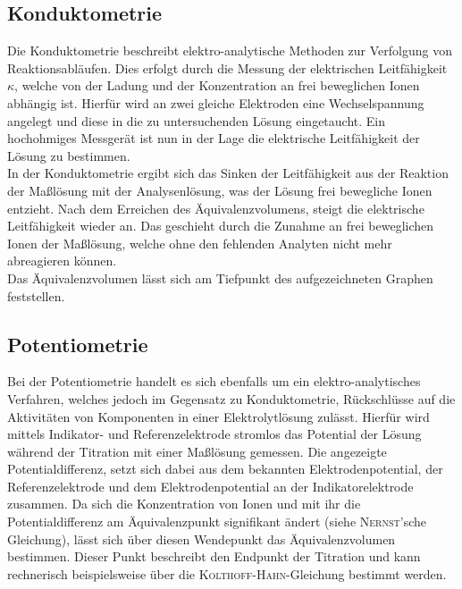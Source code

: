 \subsection*{Konduktometrie}
Die Konduktometrie beschreibt elektro-analytische Methoden zur Verfolgung von Reaktionsabläufen. Dies erfolgt durch die Messung der elektrischen Leitfähigkeit $\kappa$, welche von der Ladung und der Konzentration an frei beweglichen Ionen abhängig ist. Hierfür wird an zwei gleiche Elektroden eine Wechselspannung angelegt und diese in die zu untersuchenden Lösung eingetaucht. Ein hochohmiges Messgerät ist nun in der Lage die elektrische Leitfähigkeit der Lösung zu bestimmen.\\
In der Konduktometrie ergibt sich das Sinken der Leitfähigkeit aus der Reaktion der Maßlösung mit der Analysenlösung, was der Lösung frei bewegliche Ionen entzieht. Nach dem Erreichen des Äquivalenzvolumens, steigt die elektrische Leitfähigkeit wieder an. Das geschieht durch die Zunahme an frei beweglichen Ionen der Maßlösung, welche ohne den fehlenden Analyten nicht mehr abreagieren können.\cite{Holze.2012}\\
Das Äquivalenzvolumen lässt sich am Tiefpunkt des aufgezeichneten Graphen feststellen.

\subsection*{Potentiometrie}
Bei der Potentiometrie handelt es sich ebenfalls um ein elektro-analytisches Verfahren, welches jedoch im Gegensatz zu Konduktometrie, Rückschlüsse auf die Aktivitäten von Komponenten in  einer Elektrolytlösung zulässt. Hierfür wird mittels Indikator- und Referenzelektrode stromlos das Potential der Lösung während der Titration mit einer Maßlösung gemessen. Die angezeigte Potentialdifferenz,  setzt sich dabei aus dem bekannten Elektrodenpotential, der Referenzelektrode und dem Elektrodenpotential an der Indikatorelektrode zusammen. Da sich die Konzentration von Ionen und mit ihr die Potentialdifferenz am Äquivalenzpunkt signifikant ändert (siehe \textsc{Nernst}'sche Gleichung), lässt sich über diesen Wendepunkt das Äquivalenzvolumen bestimmen. Dieser Punkt beschreibt den Endpunkt der Titration und kann rechnerisch beispielsweise über die \textsc{Kolthoff-Hahn}-Gleichung bestimmt werden.\cite{Brehm.2007}

